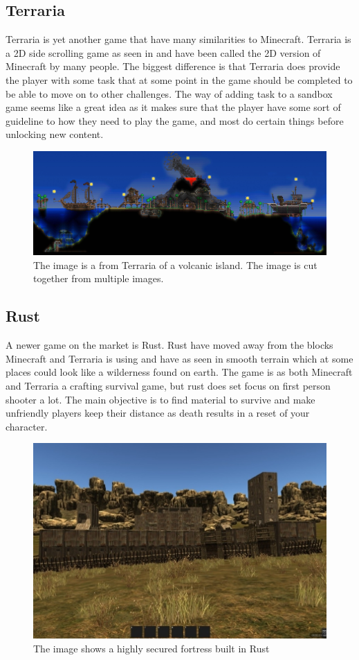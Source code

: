 \subsection{Terraria}

Terraria\cite{Terraria} is yet another game that have many similarities to Minecraft. Terraria is a 2D side scrolling game as seen in  and have been called the 2D version of Minecraft by many people. The biggest difference is that Terraria does provide the player with some task that at some point in the game should be completed to be able to move on to other challenges. The way of adding task to a sandbox game seems like a great idea as it makes sure that the player have some sort of guideline to how they need to play the game, and most do certain things before unlocking new content.

\begin{figure}[H]
	\includegraphics[width=0.7\linewidth]{img/Terraria}
	\centering
	\caption{The image is a from Terraria of a volcanic island. The image is cut together from multiple images.}
	\label{fig:Terraria}
\end{figure}


\subsection{Rust}

A newer game on the market is Rust\cite{Rust}. Rust have moved away from the blocks Minecraft and Terraria is using and have as seen in smooth terrain which at some places could look like a wilderness found on earth. The game is as both Minecraft and Terraria a crafting survival game, but rust does set focus on first person shooter a lot. The main objective is to find material to survive and make unfriendly players keep their distance as death results in a reset of your character.

\begin{figure}[H]
	\includegraphics[width=0.7\linewidth]{img/Rust}
	\centering
	\caption{The image shows a highly secured fortress built in Rust}
	\label{fig:Rust}
\end{figure}


